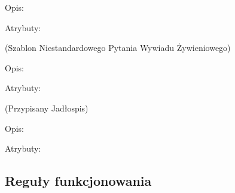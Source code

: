 \begin{enumerate}[label={\textbf{KAT/\protect\threedigits{\theenumi}}}, wide, labelwidth=!, labelindent=0pt, labelsep=0pt, series=reqs]
    Opis: \lipsum[1]
    \par
    Atrybuty:
    \begin{itemize}[series=atr]
         \label{kat:CustomNutritionalInterviewQuestion:id}
         \label{kat:CustomNutritionalInterviewQuestion:ordinalNumber}
         \label{kat:CustomNutritionalInterviewQuestion:question}
         \label{kat:CustomNutritionalInterviewQuestion:answer}
    \end{itemize}

     \label{kat:CustomNutritionalInterviewQuestionTemplate} (Szablon Niestandardowego Pytania Wywiadu Żywieniowego)

    Opis: \lipsum[1]
    \par
    Atrybuty:
    \begin{itemize}[series=atr]
         \label{kat:CustomNutritionalInterviewQuestionTemplate:id}
         \label{kat:CustomNutritionalInterviewQuestionTemplate:question}
         \label{kat:CustomNutritionalInterviewQuestionTemplate:language}
    \end{itemize}

     \label{kat:AssignedMealPlan} (Przypisany Jadłospis)

    Opis: \lipsum[1]
    \par
    Atrybuty:
    \begin{itemize}[series=atr]
         \label{kat:AssignedMealPlan:id}
         \label{kat:AssignedMealPlan:assigmentTime}
    \end{itemize}

\end{enumerate}

\subsection {Reguły funkcjonowania}

